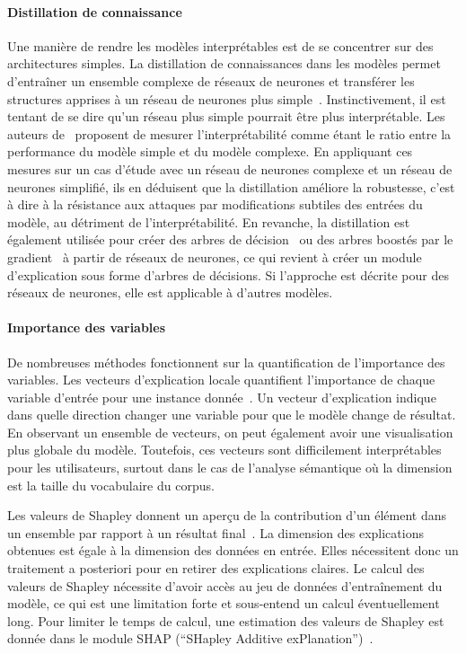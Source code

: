 \paragraph{Distillation de connaissance}
Une manière de rendre les modèles interprétables est de se concentrer sur des architectures simples. La distillation de connaissances dans les modèles permet d'entraîner un ensemble complexe de réseaux de neurones et transférer les structures apprises à un réseau de neurones plus simple~\cite{Hinton2015}. Instinctivement, il est tentant de se dire qu'un réseau plus simple pourrait être plus interprétable. Les auteurs de~\cite{Dhurandhar2017} proposent de mesurer l'interprétabilité comme étant le ratio entre la performance du modèle simple et du modèle complexe. En appliquant ces mesures sur un cas d'étude avec un réseau de neurones complexe et un réseau de neurones simplifié, ils en déduisent que la distillation améliore la robustesse, c'est à dire à la résistance aux attaques par modifications subtiles des entrées du modèle, au détriment de l'interprétabilité. En revanche, la distillation est également utilisée pour créer des arbres de décision~\cite{Liu2018,Wu2017} ou des arbres boostés par le gradient~\cite{Che2015} à partir de réseaux de neurones, ce qui revient à créer un module d'explication sous forme d'arbres de décisions. Si l'approche est décrite pour des réseaux de neurones, elle est applicable à d'autres modèles.

\paragraph{Importance des variables}
De nombreuses méthodes fonctionnent sur la quantification de l'importance des variables.
Les vecteurs d'explication locale quantifient l'importance de chaque variable d'entrée pour une instance donnée~\cite{Baehrens2010}. Un vecteur d'explication indique dans quelle direction changer une variable pour que le modèle change de résultat.
En observant un ensemble de vecteurs, on peut également avoir une visualisation plus globale du modèle.
Toutefois, ces vecteurs sont difficilement interprétables pour les utilisateurs, surtout dans le cas de l'analyse sémantique où la dimension est la taille du vocabulaire du corpus.

Les valeurs de Shapley donnent un aperçu de la contribution d'un élément dans un ensemble par rapport à un résultat final~\cite{Strumbelj2010}. La dimension des explications obtenues est égale à la dimension des données en entrée. Elles nécessitent donc un traitement a posteriori pour en retirer des explications claires.
Le calcul des valeurs de Shapley nécessite d'avoir accès au jeu de données d'entraînement du modèle, ce qui est une limitation forte et sous-entend un calcul éventuellement long. Pour limiter le temps de calcul, une estimation des valeurs de Shapley est donnée dans le module SHAP (``SHapley Additive exPlanation'')~\cite{Lundberg2017}.

